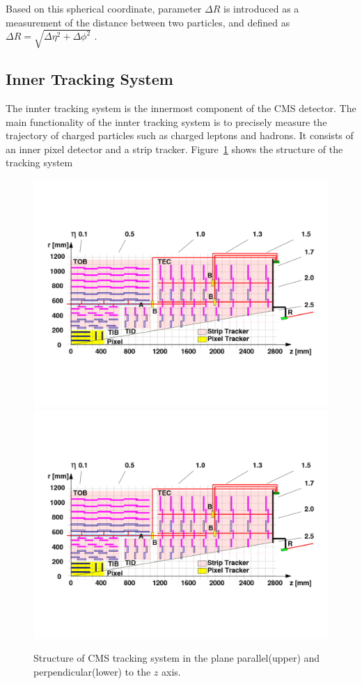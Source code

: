 Based on this spherical coordinate, parameter $\Delta R$ is introduced as a measurement of the distance between two particles, and defined as $\Delta R=\sqrt{\Delta\eta^2 + \Delta\phi^2}$
.
\subsection{Inner Tracking System} 
The innter tracking system\cite{lhc_trackerdesign} is the innermost component of the CMS detector. The main functionality of the innter tracking system is to precisely measure the trajectory of charged particles such as charged leptons and hadrons. It consists of an inner pixel detector and a strip tracker. Figure~\ref{fig:lhc_trackerbarrel} shows the structure of the tracking system
\begin{figure}[htbp]
\begin{center}
\includegraphics[width=0.7\linewidth, page=1]{figures/lhc_trackerbarrel.pdf}
\includegraphics[width=0.7\linewidth, page=2]{figures/lhc_trackerbarrel.pdf}
\caption{Structure of CMS tracking system in the plane parallel(upper) and perpendicular(lower) to the $z$ axis.}
\label{fig:lhc_trackerbarrel}
\end{center}
\end{figure}

